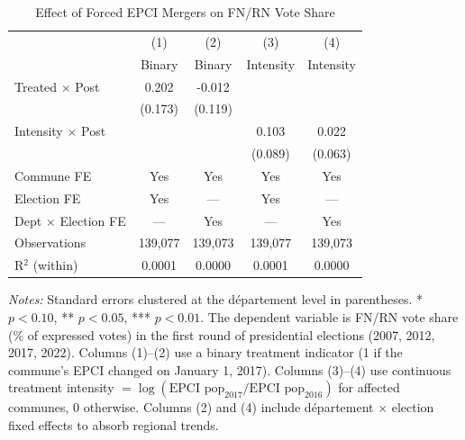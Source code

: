 \begin{table}[H]
\centering
\caption{Effect of Forced EPCI Mergers on FN/RN Vote Share}
\label{tab:main}
\begin{threeparttable}
\begin{tabular}{lcccc}
\toprule
 & (1) & (2) & (3) & (4) \\
 & Binary & Binary & Intensity & Intensity \\
\midrule
Treated $\times$ Post & 0.202 & -0.012 & & \\
 & (0.173) & (0.119) & & \\
Intensity $\times$ Post & & & 0.103 & 0.022 \\
 & & & (0.089) & (0.063) \\
\midrule
Commune FE & Yes & Yes & Yes & Yes \\
Election FE & Yes & --- & Yes & --- \\
Dept $\times$ Election FE & --- & Yes & --- & Yes \\
Observations & 139,077 & 139,073 & 139,077 & 139,073 \\
R$^2$ (within) & 0.0001 & 0.0000 & 0.0001 & 0.0000 \\
\bottomrule
\end{tabular}
\begin{tablenotes}[flushleft]
\small
\item \textit{Notes:} Standard errors clustered at the d\'epartement level in parentheses.  * $p<0.10$, ** $p<0.05$, *** $p<0.01$.  The dependent variable is FN/RN vote share (\% of expressed votes) in the first round of  presidential elections (2007, 2012, 2017, 2022). Columns (1)--(2) use a binary treatment indicator  (1 if the commune's EPCI changed on January 1, 2017). Columns (3)--(4) use continuous treatment intensity  $= \log(\text{EPCI pop}_{2017} / \text{EPCI pop}_{2016})$ for affected communes, 0 otherwise.  Columns (2) and (4) include d\'epartement $\times$ election fixed effects to absorb regional trends.
\end{tablenotes}
\end{threeparttable}
\end{table}
